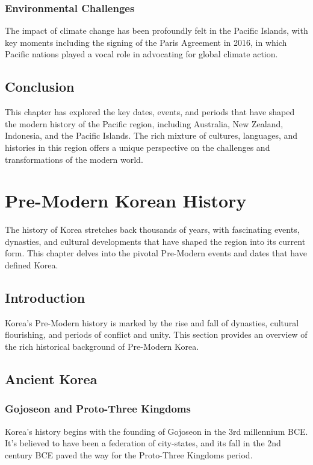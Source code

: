 \documentclass{book}
\begin{document}
\subsection{Environmental Challenges}
\label{subsec:environmental-challenges}
The impact of climate change has been profoundly felt in the Pacific Islands, with key moments including the signing of the Paris Agreement in 2016, in which Pacific nations played a vocal role in advocating for global climate action.

\section{Conclusion}
\label{sec:conclusion-modern-pacific}
This chapter has explored the key dates, events, and periods that have shaped the modern history of the Pacific region, including Australia, New Zealand, Indonesia, and the Pacific Islands. The rich mixture of cultures, languages, and histories in this region offers a unique perspective on the challenges and transformations of the modern world.

\chapter{Pre-Modern Korean History}
\label{ch:pre-modern-korean-history}

The history of Korea stretches back thousands of years, with fascinating events, dynasties, and cultural developments that have shaped the region into its current form. This chapter delves into the pivotal Pre-Modern events and dates that have defined Korea.

\section{Introduction}
\label{sec:introduction-pre-modern-korea}
Korea’s Pre-Modern history is marked by the rise and fall of dynasties, cultural flourishing, and periods of conflict and unity. This section provides an overview of the rich historical background of Pre-Modern Korea.

\section{Ancient Korea}
\label{sec:ancient-korea}

\subsection{Gojoseon and Proto-Three Kingdoms}
\label{subsec:gojoseon-proto-three-kingdoms}
Korea’s history begins with the founding of Gojoseon in the 3rd millennium BCE. It’s believed to have been a federation of city-states, and its fall in the 2nd century BCE paved the way for the Proto-Three Kingdoms period.
\end{document}

